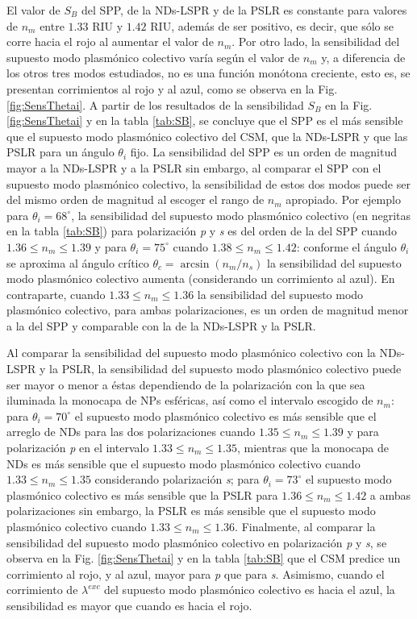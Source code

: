El valor de $S_B$ del SPP, de la NDs-LSPR y de la PSLR es constante para valores de $n_m$ entre $1.33$ RIU y $1.42$ RIU, además de ser positivo, es decir, que sólo se corre hacia el rojo al aumentar el valor de $n_m$. Por otro lado, la sensibilidad del supuesto modo  plasmónico colectivo varía según el valor de $n_m$ y, a diferencia de los otros tres modos estudiados, no es una función monótona creciente, esto es, se presentan corrimientos al rojo y al azul, como se observa en la Fig. \ref{fig:SensThetai}. A partir de los resultados de la sensibilidad $S_B$ en la Fig. \ref{fig:SensThetai} y en la tabla \ref{tab:SB}, se concluye que el SPP es el más sensible que el supuesto modo  plasmónico colectivo del CSM, que la NDs-LSPR y que las PSLR para un ángulo $\theta_i$ fijo. La sensibilidad del SPP es un orden de magnitud mayor a la NDs-LSPR y a la PSLR sin embargo, al comparar el SPP con el supuesto modo  plasmónico colectivo, la sensibilidad de estos dos modos puede ser del mismo orden de magnitud al escoger el rango de $n_m$ apropiado. Por ejemplo para $\theta_i = 68^\circ$, la sensibilidad del supuesto modo  plasmónico colectivo (en negritas en la tabla \ref{tab:SB}) para polarización \emph{p} y \emph{s} es del orden de la del SPP cuando $1.36\leq n_m \leq 1.39$ y para $\theta_i =75^\circ$ cuando $1.38\leq n_m \leq 1.42$: conforme el ángulo $\theta_i$ se aproxima al ángulo crítico $\theta_c=\arcsin(n_m/n_s)$ la sensibilidad del supuesto modo  plasmónico colectivo aumenta (considerando un corrimiento al azul). En contraparte, cuando $1.33\leq n_m \leq 1.36$ la sensibilidad del supuesto modo  plasmónico colectivo, para ambas polarizaciones, es un orden de magnitud menor a la del SPP y comparable con la de la NDs-LSPR y la PSLR.

Al comparar la sensibilidad del supuesto modo  plasmónico colectivo con la NDs-LSPR y la PSLR, la sensibilidad del supuesto modo  plasmónico colectivo puede ser mayor o menor a éstas dependiendo de la polarización con la que sea iluminada la monocapa de NPs esféricas, así como el intervalo escogido de $n_m$:  para $\theta_i = 70^\circ$ el supuesto modo  plasmónico colectivo es más sensible que el arreglo de NDs para las dos polarizaciones cuando $1.35 \leq n_m \leq 1.39$ y para polarización \emph{p} en el intervalo $1.33\leq n_m \leq 1.35$, mientras que la monocapa de NDs es más sensible que el supuesto modo  plasmónico colectivo cuando $1.33\leq n_m \leq 1.35$ considerando polarización \emph{s}; para $\theta_i=73^\circ$ el supuesto modo  plasmónico colectivo es más sensible que la PSLR para $1.36\leq n_m \leq 1.42$  a ambas polarizaciones sin embargo, la PSLR es más sensible que el supuesto modo  plasmónico colectivo cuando $1.33\leq n_m \leq 1.36$. Finalmente, al comparar la sensibilidad del supuesto modo  plasmónico colectivo en polarización \emph{p} y \emph{s}, se observa en la Fig. \ref{fig:SensThetai} y en la tabla \ref{tab:SB} que el CSM predice un corrimiento al rojo, y al azul, mayor para \emph{p} que para \emph{s}. Asimismo, cuando el corrimiento de $\lambda^{exc}$ del supuesto modo  plasmónico colectivo es hacia el azul, la sensibilidad es mayor que cuando es hacia el rojo.

